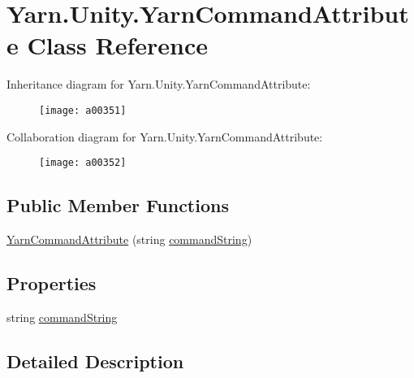 \hypertarget{a00104}{\section{Yarn.\-Unity.\-Yarn\-Command\-Attribute Class Reference}
\label{a00104}
}


Inheritance diagram for Yarn.\-Unity.\-Yarn\-Command\-Attribute\-:
\nopagebreak
\begin{figure}[H]
\begin{center}
\leavevmode
\texttt{[image: a00351]}
\end{center}
\end{figure}


Collaboration diagram for Yarn.\-Unity.\-Yarn\-Command\-Attribute\-:
\nopagebreak
\begin{figure}[H]
\begin{center}
\leavevmode
\texttt{[image: a00352]}
\end{center}
\end{figure}
\subsection*{Public Member Functions}
\begin{DoxyCompactItemize}
\item 
\hyperlink{a00104_a9c0d57cd72c091f63895944959e98330}{Yarn\-Command\-Attribute} (string \hyperlink{a00104_a6d513a725c819ffcdaa9c5788472ec8d}{command\-String})
\end{DoxyCompactItemize}
\subsection*{Properties}
\begin{DoxyCompactItemize}
\item 
string \hyperlink{a00104_a6d513a725c819ffcdaa9c5788472ec8d}{command\-String}
\end{DoxyCompactItemize}


\subsection{Detailed Description}


